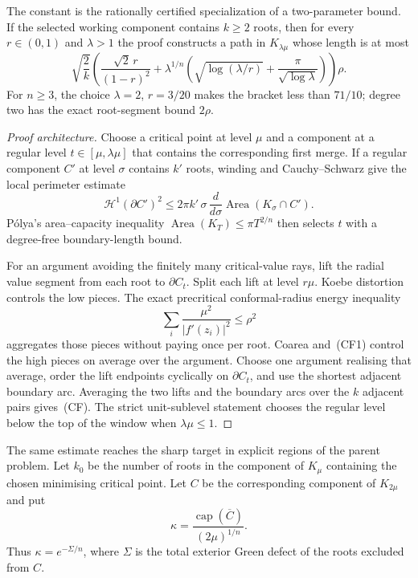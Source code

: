 \documentclass[11pt]{article}
\begin{document}
The constant is the rationally certified specialization of a two-parameter
bound.  If the selected working component contains $k\ge2$ roots, then for
every $r\in(0,1)$ and $\lambda>1$ the proof constructs a path in
$K_{\lambda\mu}$ whose length is at most
\[
 \sqrt{\frac2k}\left(
   \frac{\sqrt2\,r}{(1-r)^2}
   +\lambda^{1/n}\left(
      \sqrt{\log(\lambda/r)}+
      \frac{\pi}{\sqrt{\log\lambda}}
    \right)
 \right)\rho.                                      \tag{CF}
\]
For $n\ge3$, the choice $\lambda=2$, $r=3/20$ makes the bracket less
than $71/10$; degree two has the exact root-segment bound $2\rho$.

\begin{proof}[Proof architecture]
Choose a critical point at level $\mu$ and a component at a regular level
$t\in[\mu,\lambda\mu]$ that contains the corresponding first merge.  If a
regular component $C'$ at level $\sigma$ contains $k'$ roots, winding and
Cauchy--Schwarz give the local perimeter estimate
\[
 \mathcal H^1(\partial C')^2
 \le2\pi k'\,\sigma\,\frac{d}{d\sigma}
      \operatorname{Area}(K_\sigma\cap C').         \tag{CF1}
\]
P\'olya's area--capacity inequality
$\operatorname{Area}(K_T)\le\pi T^{2/n}$ then selects $t$ with a
degree-free boundary-length bound.

For an argument avoiding the finitely many critical-value rays, lift the
radial value segment from each root to $\partial C_t$.  Split each lift at
level $r\mu$.  Koebe distortion controls the low pieces.  The exact
precritical conformal-radius energy inequality
\[
 \sum_i\frac{\mu^2}{|f'(z_i)|^2}\le\rho^2          \tag{CF2}
\]
aggregates those pieces without paying once per root.  Coarea and~(CF1)
control the high pieces on average over the argument.  Choose one argument
realising that average, order the lift endpoints cyclically on
$\partial C_t$, and use the shortest adjacent boundary arc.  Averaging the
two lifts and the boundary arcs over the $k$ adjacent pairs gives~(CF).
The strict unit-sublevel statement chooses the regular level below the top of
the window when $\lambda\mu\le1$.
\end{proof}

The same estimate reaches the sharp target in explicit regions of the parent
problem.  Let $k_0$ be the number of roots in the component of $K_\mu$
containing the chosen minimising critical point.  Let $C$ be the corresponding
component of $K_{2\mu}$ and put
\[
 \kappa=\frac{\operatorname{cap}(\overline C)}{(2\mu)^{1/n}}.
\]
Thus $\kappa=e^{-\Sigma/n}$, where $\Sigma$ is the total exterior Green
defect of the roots excluded from $C$.
\end{document}
